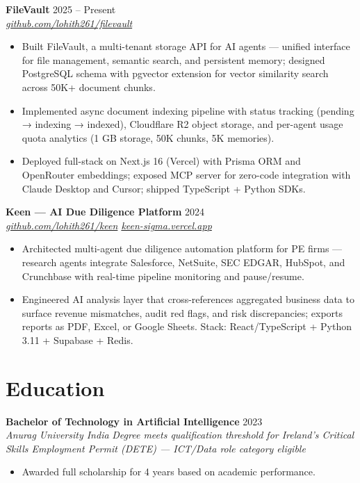 \documentclass[10pt,letterpaper]{article}
\newcommand{\entry}[3]{%
  \vspace{3pt}\textbf{#1} \hfill #3 \\
  \textit{\small #2}\vspace{1pt}}
\begin{document}
\entry{FileVault}{\href{https://github.com/lohith261/filevault}{github.com/lohith261/filevault}}{2025 -- Present}
\begin{itemize}
  \item Built FileVault, a multi-tenant storage API for AI agents --- unified interface for file management, semantic search, and persistent memory; designed PostgreSQL schema with pgvector extension for vector similarity search across 50K+ document chunks.
  \item Implemented async document indexing pipeline with status tracking (pending → indexing → indexed), Cloudflare R2 object storage, and per-agent usage quota analytics (1 GB storage, 50K chunks, 5K memories).
  \item Deployed full-stack on Next.js 16 (Vercel) with Prisma ORM and OpenRouter embeddings; exposed MCP server for zero-code integration with Claude Desktop and Cursor; shipped TypeScript + Python SDKs.
\end{itemize}

\entry{Keen --- AI Due Diligence Platform}{\href{https://github.com/lohith261/keen}{github.com/lohith261/keen} \quad\textbullet\quad \href{https://keen-sigma.vercel.app/}{keen-sigma.vercel.app}}{2024}
\begin{itemize}
  \item Architected multi-agent due diligence automation platform for PE firms --- research agents integrate Salesforce, NetSuite, SEC EDGAR, HubSpot, and Crunchbase with real-time pipeline monitoring and pause/resume.
  \item Engineered AI analysis layer that cross-references aggregated business data to surface revenue mismatches, audit red flags, and risk discrepancies; exports reports as PDF, Excel, or Google Sheets. Stack: React/TypeScript + Python 3.11 + Supabase + Redis.
\end{itemize}

\section{Education}

\entry{Bachelor of Technology in Artificial Intelligence}{Anurag University \textbullet{} India}{2023}
\newline\textit{\small Degree meets qualification threshold for Ireland's Critical Skills Employment Permit (DETE) --- ICT/Data role category eligible}
\begin{itemize}
  \item Awarded full scholarship for 4 years based on academic performance.
\end{itemize}
\end{document}
